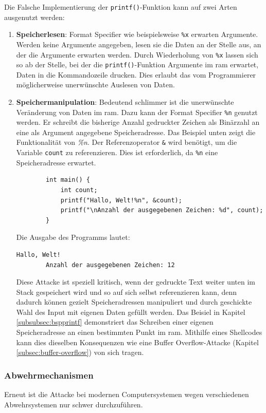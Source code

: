 \documentclass[11pt, a4paper]{article}
\begin{document}
Die Falsche Implementierung der \texttt{printf()}-Funktion kann auf zwei Arten ausgenutzt werden:
\begin{enumerate}
	\item \textbf{Speicherlesen}: Format Specifier wie beispielsweise \texttt{\%x} erwarten Argumente. Werden keine Argumente angegeben, lesen sie die Daten an der Stelle aus, an der die Argumente erwarten werden. Durch Wiederholung von \texttt{\%x} lassen sich so ab der Stelle, bei der die \texttt{printf()}-Funktion Argumente im \gls{ram} erwartet, Daten in die Kommandozeile drucken. Dies erlaubt das vom Programmierer möglicherweise unerwünschte Auslesen von Daten.
	\item \textbf{Speichermanipulation}: Bedeutend schlimmer ist die unerwünschte Veränderung von Daten im \gls{ram}. Dazu kann der Format Specifier \texttt{\%n} genutzt werden. Er schreibt die bisherige Anzahl gedruckter Zeichen als Binärzahl an eine als Argument angegebene Speicheradresse. Das Beispiel unten zeigt die Funktionalität von \textit{\%n}. Der Referenzoperator \texttt{\&} wird benötigt, um die Variable \texttt{count} zu referenzieren. Dies ist erforderlich, da \texttt{\%n} eine Speicheradresse erwartet.
	\begin{lstlisting}
		int main() {
			int count;
			printf("Hallo, Welt!%n", &count);
			printf("\nAnzahl der ausgegebenen Zeichen: %d", count); 
		}
	\end{lstlisting}
	Die Ausgabe des Programms lautet:
	\begin{lstlisting}[style=COutputStyle]
		Hallo, Welt!
		Anzahl der ausgegebenen Zeichen: 12
	\end{lstlisting}
	Diese Attacke ist speziell kritisch, wenn der gedruckte Text weiter unten im Stack gespeichert wird und so auf sich selbst referenzieren kann, denn dadurch können gezielt Speicheradressen manipuliert und durch geschickte Wahl des Input mit eigenen Daten gefüllt werden. Das Beisiel in Kapitel \ref{subsubsec:bspprintf} demonstriert das Schreiben einer eigenen Speicheradresse an einen bestimmten Punkt im \gls{ram}. Mithilfe eines Shellcodes kann dies dieselben Konsequenzen wie eine Buffer Overflow-Attacke (Kapitel \ref{subsec:buffer-overflow}) von sich tragen.
\end{enumerate}

\subsubsection{Abwehrmechanismen}
Erneut ist die Attacke bei modernen Computersystemen wegen verschiedenen Abwehrsystemen nur schwer durchzuführen.
\end{document}
